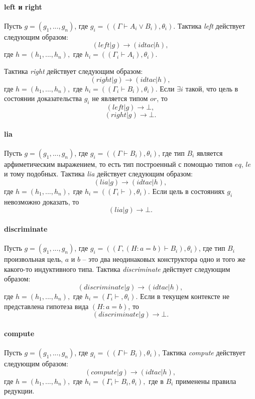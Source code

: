 \documentclass[12pt]{article}
\begin{document}
\paragraph{left и right}
Пусть $g = (g_1, ..., g_n)$, где $g_i = ((\Gamma \vdash A_i \vee B_i), \theta_i)$.
Тактика \textit{left} действует следующим образом:
$$(left|g) \xrightarrow{} (idtac| h),$$
где $h=(h_1, ...,h_n),$ где $h_i= ((\Gamma_i \vdash A_i), \theta_i)$.

Тактика \textit{right} действует следующим образом:
$$(right|g) \xrightarrow{} (idtac| h),$$
где $h=(h_1, ...,h_n),$ где $h_i= ((\Gamma_i \vdash B_i), \theta_i)$.
Если $\exists i$ такой, что цель в состоянии доказательства $g_i$ не является типом $or$, то
$$(left|g) \xrightarrow{} \bot,$$ 
$$(right|g) \xrightarrow{} \bot.$$ 


\paragraph{lia}
Пусть $g = (g_1, ..., g_n)$, где $g_i = ((\Gamma \vdash B_i), \theta_i)$, где тип $B_i$ является арфиметическим выражением, то есть тип построенный с помощью типов $eq$, $le$ и тому подобных.
Тактика \textit{lia} действует следующим образом:
$$(lia|g) \xrightarrow{} (idtac| h),$$
где $h=(h_1, ...,h_n),$ где $h_i= ((\Gamma_i \vdash), \theta_i)$. Если цель в состояниях $g_i$ невозможно доказать, то
$$(lia|g) \xrightarrow{} \bot.$$

\paragraph{discriminate}
Пусть $g = (g_1, ..., g_n)$, где $g_i = ((\Gamma, (H: a = b) \vdash B_i), \theta_i)$, где тип $B_i$ произвольная цель, $a$ и $b$ -- это два неодинаковых конструктора одно и того же какого-то индуктивного типа.
Тактика \textit{discriminate} действует следующим образом:
$$(discriminate|g) \xrightarrow{} (idtac| h),$$
где $h=(h_1, ...,h_n),$ где $h_i= (\Gamma_i \vdash , \theta_i)$.
Если в текущем контексте не представлена гипотеза вида $(H:a=b)$, то 
$$(discriminate|g) \xrightarrow{} \bot.$$

\paragraph{compute}
Пусть $g = (g_1, ..., g_n)$, где $g_i = ((\Gamma \vdash B_i), \theta_i)$,
Тактика \textit{compute} действует следующим образом:
$$(compute|g) \xrightarrow{} (idtac| h),$$
где $h=(h_1, ...,h_n),$ где $h_i= (\Gamma_i \vdash  B_i , \theta_i),$ где в $B_i$ применены правила редукции.
\end{document}
